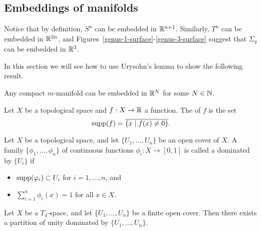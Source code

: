 \subsection{Embeddings of manifolds}
Notice that by definition, $S^n$ can be embedded in $\mathbb{R}^{n+1}$. Similarly, $T^n$ can be embedded in $\mathbb{R}^{2n}$, and Figures~\ref{genus-1-surface}-\ref{genus-3-surface} suggest that $\Sigma_g$ can be embedded in $\mathbb{R}^3$.

In this section we will see how to use Urysohn's lemma to show the following result.
\begin{thm}
  \label{embedding-of-manifolds}
  Any compact $m$-manifold can be embedded in $\mathbb{R}^N$ for some $N \in \mathbb{N}$.
\end{thm}
\begin{defn}
  Let $X$ be a topological space and $f : X \to \mathbb{R}$ a function. The  of $f$ is the set
  \[
    \operatorname{supp}(f) = \overline{\{x \mid f(x) \not= 0\}}.
  \]
\end{defn}
\begin{defn}
  Let $X$ be a topological space, and let $\{U_1, \dots, U_n\}$ be an open cover of $X$. A family $\{\phi_1,\dots,\phi_n\}$ of continuous functions $\phi_i : X \to [0,1]$ is called a  dominated by $\{U_i\}$ if
  \begin{itemize}
    \item $\operatorname{supp}(\varphi_i) \subset U_i$ for $i = 1, \dots, n$, and
    \item $\sum_{i=1}^n \phi_i(x) = 1$ for all $x \in X$.
  \end{itemize}
\end{defn}
\begin{thm}
  \label{t4-partition-of-unity}
  Let $X$ be a $T_4$-space, and let $\{U_1, \dots, U_n\}$ be a finite open cover. Then there exists a partition of unity dominated by $\{U_1,\dots,U_n\}$.
\end{thm}
